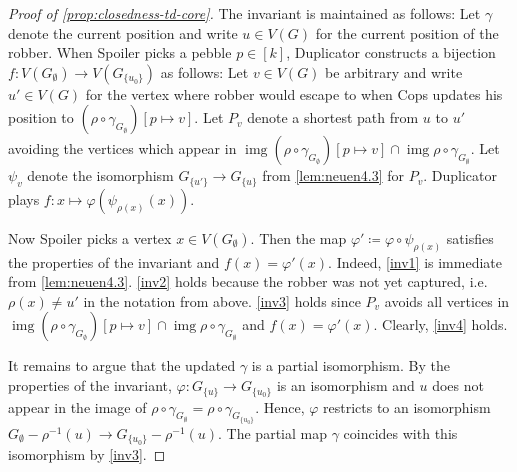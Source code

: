 \documentclass[a4paper,UKenglish,cleveref, autoref, thm-restate]{lipics-v2021}
\renewcommand{\phi}{\varphi}
\DeclareMathOperator{\img}{img}
\begin{document}
\begin{proof}[Proof of \cref{prop:closedness-td-core}]
	The invariant is maintained as follows: Let $\gamma$ denote the current position and write $u \in V(G)$ for the current position of the robber. When Spoiler picks a pebble $p \in [k]$, Duplicator constructs a bijection $f \colon V(G_\emptyset) \to V(G_{\{u_0\}})$ as follows:
	Let $v \in V(G)$ be arbitrary and write $u' \in V(G)$ for the vertex where robber would escape to when Cops updates his position to $(\rho \circ \gamma_{G_\emptyset})[p \mapsto v]$. Let $P_v$ denote a shortest path from $u$ to $u'$ avoiding the vertices which appear in $\img (\rho \circ \gamma_{G_\emptyset})[p \mapsto v] \cap \img \rho \circ \gamma_{G_\emptyset}$.
	Let $\psi_v$ denote the isomorphism $G_{\{u'\}} \to G_{\{u\}}$ from \cref{lem:neuen4.3} for $P_v$.
	Duplicator plays $f \colon x \mapsto \phi(\psi_{\rho(x)}(x))$.
	
	Now Spoiler picks a vertex $x \in V(G_\emptyset)$. Then the map $\phi' \coloneqq \phi \circ \psi_{\rho(x)}$ satisfies the properties of the invariant and $f(x) = \phi'(x)$. Indeed, \cref{inv1} is immediate from \cref{lem:neuen4.3}. \cref{inv2} holds because the robber was not yet captured, i.e.\@ $\rho(x) \neq u'$ in the notation from above. \cref{inv3} holds since $P_v$ avoids all vertices in $\img (\rho \circ \gamma_{G_\emptyset})[p \mapsto v] \cap \img \rho \circ \gamma_{G_\emptyset}$ and $f(x) = \phi'(x)$. Clearly, \cref{inv4} holds.
	
	It remains to argue that the updated $\gamma$ is a partial isomorphism. By the properties of the invariant, $\phi \colon G_{\{u\}} \to G_{\{u_0\}}$ is an isomorphism and $u$ does not appear in the image of $\rho \circ \gamma_{G_\emptyset} = \rho \circ \gamma_{G_{\{u_0\}}}$. Hence, $\phi$ restricts to an isomorphism $G_\emptyset - \rho^{-1}(u) \to G_{\{u_0\}} - \rho^{-1}(u)$. The partial map $\gamma$ coincides with this isomorphism by \cref{inv3}.
\end{proof}
 
\end{document}
